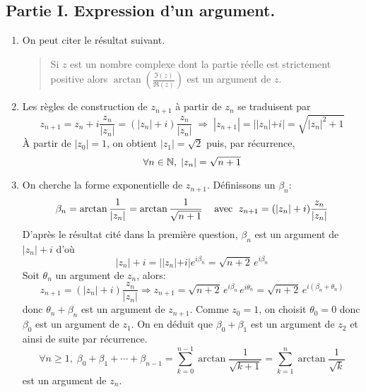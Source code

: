 \subsection*{Partie I. Expression d'un argument.}
\begin{enumerate}
  \item On peut citer le résultat suivant.
\begin{quote}
Si $z$ est un nombre complexe dont la partie réelle est strictement positive alors $\arctan(\frac{\Im(z)}{\Re(z)})$ est un argument de $z$.  
\end{quote}

  \item Les r{\`e}gles de construction de $z_{n+1}$ {\`a} partir de $z_n$ se traduisent par
\begin{displaymath}
z_{n+1}=z_n+i\frac{z_n}{|z_n|}= ( |z_n|+i)\frac{z_n}{|z_n|}
\; \Rightarrow \; 
|z_{n+1}|= ||z_n|+i|=\sqrt{|z_n|^2+1}
\end{displaymath}
\`A partir de $|z_0|=1$,  on obtient $|z_1|=\sqrt{2}$ puis, par r{\'e}currence,
\begin{displaymath}
 \forall n \in \mathbb{N},\;|z_n|=\sqrt{n+1}
\end{displaymath}

\item On cherche la forme exponentielle de $z_{n+1}$. Définissons un $\beta_n$:
\begin{displaymath}
\beta_n = \arctan \frac{1}{|z_n|} = \arctan\frac{1}{\sqrt{n+1}}\hspace{0.3cm}\text{ avec }\;   z_{n+1} = ( |z_n|+i)\frac{z_n}{|z_n|}
\end{displaymath}
D'après le résultat cité dans la première question, $\beta_n$ est un argument de $|z_n|+i$ d'où
\begin{displaymath}
  |z_n|+i = ||z_n|+i| e^{i\beta_n} = \sqrt{n+2}\, e^{i\beta_n} 
\end{displaymath}
Soit $\theta_n$ un argument de $z_n$, alors:
\begin{displaymath}
z_{n+1} = ( |z_n|+i)\frac{z_n}{|z_n|}
\Rightarrow
z_{n+1} = \sqrt{n+2}\, e^{i\beta_n}\,e^{i\theta_n} = \sqrt{n+2}\, e^{i(\beta_n + \theta_n)} 
\end{displaymath}
donc $\theta_n + \beta_n$ est un argument de $z_{n+1}$.\newline
Comme $z_0 = 1$, on choisit $\theta_0=0$ donc $\beta_0$ est un argument de $z_1$.\newline
On en déduit que $\beta_0 + \beta_1$ est un argument de $z_2$ et ainsi de suite par récurrence.
\begin{displaymath}
\forall n\geq 1,\;  \beta_0 + \beta_1 + \cdots + \beta_{n-1} = \sum_{k=0}^{n-1}\arctan\frac{1}{\sqrt{k+1}} = \sum_{k=1}^n\arctan\frac{1}{\sqrt{k}}
\end{displaymath}
est un argument de $z_n$.
  \end{enumerate}

